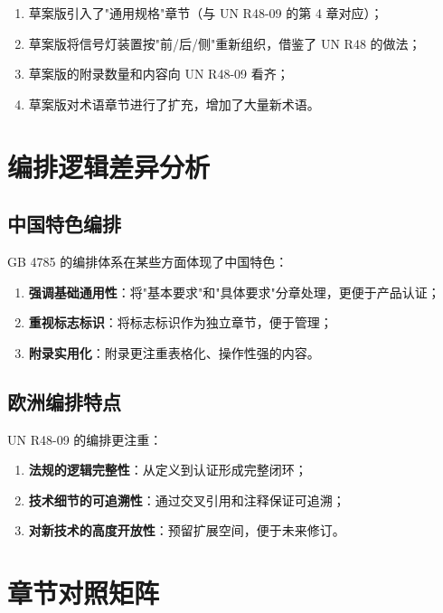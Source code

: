 \begin{enumerate}[leftmargin=2em]
    \item 草案版引入了"通用规格"章节（与 UN R48-09 的第 4 章对应）；
    \item 草案版将信号灯装置按"前/后/侧"重新组织，借鉴了 UN R48 的做法；
    \item 草案版的附录数量和内容向 UN R48-09 看齐；
    \item 草案版对术语章节进行了扩充，增加了大量新术语。
\end{enumerate}

\section{编排逻辑差异分析}

\subsection{中国特色编排}

GB 4785 的编排体系在某些方面体现了中国特色：

\begin{enumerate}[leftmargin=2em]
    \item \textbf{强调基础通用性}：将"基本要求"和"具体要求"分章处理，更便于产品认证；
    \item \textbf{重视标志标识}：将标志标识作为独立章节，便于管理；
    \item \textbf{附录实用化}：附录更注重表格化、操作性强的内容。
\end{enumerate}

\subsection{欧洲编排特点}

UN R48-09 的编排更注重：

\begin{enumerate}[leftmargin=2em]
    \item \textbf{法规的逻辑完整性}：从定义到认证形成完整闭环；
    \item \textbf{技术细节的可追溯性}：通过交叉引用和注释保证可追溯；
    \item \textbf{对新技术的高度开放性}：预留扩展空间，便于未来修订。
\end{enumerate}

\section{章节对照矩阵}


